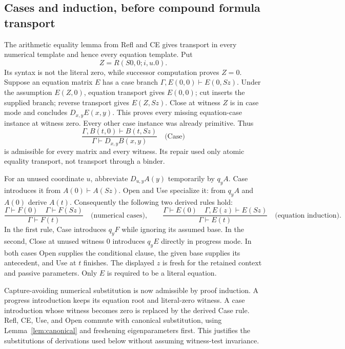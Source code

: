 \subsection{Cases and induction, before compound formula transport}

The arithmetic equality lemma from Refl and CE gives transport in every
numerical template and hence every equation template. Put
\[
                 Z=R(S0,0;i,u.0).
\]
Its syntax is not the literal zero, while successor computation proves
$Z=0$. Suppose an equation matrix $E$ has a case branch
$\Gamma,E(0,0)\vdash E(0,Sz)$. Under the assumption $E(Z,0)$,
equation transport gives $E(0,0)$; cut inserts the supplied branch; reverse
transport gives $E(Z,Sz)$. Close at witness $Z$ is in case mode and
concludes $D_{x,y}E(x,y)$. This proves every missing equation-case instance
at witness zero. Every other case instance was already primitive. Thus
\[
 \frac{\Gamma,B(t,0)\vdash B(t,Sz)}
      {\Gamma\vdash D_{x,y}B(x,y)}\quad\text{(Case)}
\tag{Case}
\]
is admissible for every matrix and every witness. Its repair used only
atomic equality transport, not transport through a binder.

For an unused coordinate $u$, abbreviate $D_{u,y}A(y)$ temporarily by
$q_yA$. Case introduces it from $A(0)\vdash A(Sz)$. Open and Use
specialize it: from $q_yA$ and $A(0)$ derive $A(t)$.
Consequently the following two derived rules hold:
\[
 \frac{\Gamma\vdash F(0)\quad\Gamma\vdash F(Sz)}
      {\Gamma\vdash F(t)}\quad\text{(numerical cases)},
 \qquad
 \frac{\Gamma\vdash E(0)\quad\Gamma,E(z)\vdash E(Sz)}
      {\Gamma\vdash E(t)}\quad\text{(equation induction)}.
\tag{NC, EI}
\]
In the first rule, Case introduces $q_yF$ while ignoring its assumed base.
In the second, Close at unused witness $0$ introduces $q_yE$ directly
in progress mode. In both cases Open supplies the conditional clause,
the given base supplies its antecedent, and Use at $t$ finishes. The
displayed $z$ is fresh for the retained context and passive parameters.
Only $E$ is required to be a literal equation.

Capture-avoiding numerical substitution is now admissible by proof
induction. A progress introduction keeps its equation root and literal-zero
witness. A case introduction whose witness becomes zero is replaced by
the derived Case rule. Refl, CE, Use, and Open commute with canonical
substitution, using Lemma~\ref{lem:canonical} and
freshening eigenparameters first. This justifies the substitutions of
derivations used below without assuming witness-test invariance.

